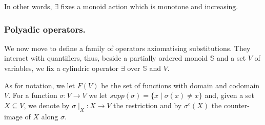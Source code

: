 \documentclass{llncs}
\def\monid{{\mathbf 0}}
\def\monid{\mathbf{1}}
\begin{document}
In other words, $\exists$ fixes a monoid action which is monotone and increasing.

%
%
%
%


\subsubsection{Polyadic operators.}
We now move to define a family of operators axiomatising substitutions.  
They interact with quantifiers, thus, beside a partially ordered monoid $\mathbb{S}$
and a set $V$ of variables, we fix a cylindric operator $\exists$ over ${\mathbb S}$ and $V$.

As for notation, we let $F(V)$ be the set of functions with domain and codomain $V$.
For a function $\sigma: V \rightarrow V$ we let $supp(\sigma) = \{x \mid \sigma(x) \neq x\}$
and, given a set $X \subseteq V$, we denote by 
$\sigma \mid_{X}: X \rightarrow V$ the restriction and
by $\sigma^{c}(X)$ the counter-image of $X$ along $\sigma$.
\end{document}
